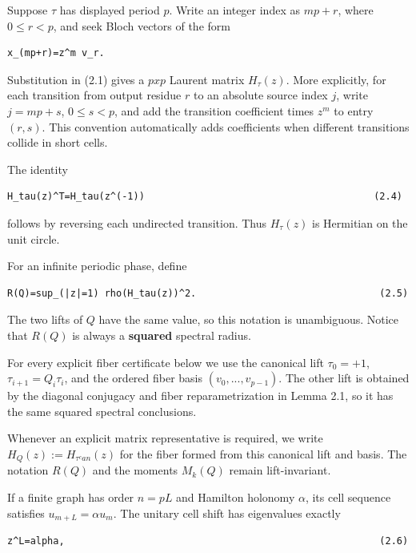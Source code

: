 Suppose \(\tau\) has displayed period \(p\). Write an integer index as \(mp+r\),
where \(0\le r<p\), and seek Bloch vectors of the form

\begin{lstlisting}[language={}]
x_(mp+r)=z^m v_r.
\end{lstlisting}

Substitution in (2.1) gives a \(p x p\) Laurent matrix \(H_\tau(z)\). More
explicitly, for each transition from output residue \(r\) to an absolute source
index \(j\), write \(j=mp+s\), \(0\le s<p\), and add the transition coefficient times
\(z^m\) to entry \((r,s)\). This convention automatically adds coefficients when
different transitions collide in short cells.

The identity

\begin{lstlisting}[language={}]
H_tau(z)^T=H_tau(z^(-1))                                        (2.4)
\end{lstlisting}

follows by reversing each undirected transition. Thus \(H_\tau(z)\) is Hermitian
on the unit circle.

For an infinite periodic phase, define

\begin{lstlisting}[language={}]
R(Q)=sup_(|z|=1) rho(H_tau(z))^2.                                (2.5)
\end{lstlisting}

The two lifts of \(Q\) have the same value, so this notation is unambiguous.
Notice that \(R(Q)\) is always a \textbf{squared} spectral radius.

For every explicit fiber certificate below we use the canonical lift
\(\tau_0=+1\), \(\tau_{i+1}=Q_i \tau_i\), and the ordered fiber basis
\((v_0,...,v_{p-1})\). The other lift is obtained by the diagonal conjugacy and
fiber reparametrization in Lemma 2.1, so it has the same squared spectral
conclusions.

Whenever an explicit matrix representative is required, we write
\(H_Q(z):=H_{\tau^can}(z)\) for the fiber formed from this canonical lift and
basis. The notation \(R(Q)\) and the moments \(M_k(Q)\) remain lift-invariant.

If a finite graph has order \(n=pL\) and Hamilton holonomy \(\alpha\), its cell
sequence satisfies \(u_{m+L}=\alpha u_m\). The unitary cell shift has eigenvalues
exactly

\begin{lstlisting}[language={}]
z^L=alpha,                                                       (2.6)
\end{lstlisting}

